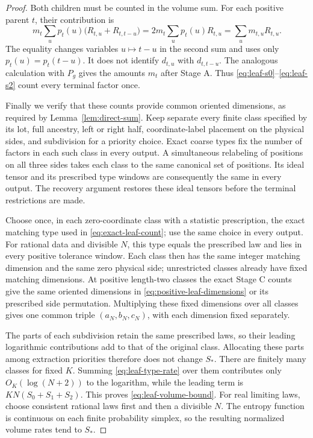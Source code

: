\begin{proof}
Both children must be counted in the volume sum.  For each positive
parent $t$, their contribution is
\[
 m_t\sum_u p_t(u)\bigl(R_{t,u}+R_{t,t-u}\bigr)
       =2m_t\sum_u p_t(u)R_{t,u}
       =\sum_u m_{t,u}R_{t,u}.
\]
The equality changes variables $u\mapsto t-u$ in the second sum and
uses only $p_t(u)=p_t(t-u)$.  It does not identify
$d_{t,u}$ with $d_{t,t-u}$.  The analogous calculation with $P_g$
gives the amounts $m_t$ after Stage A.  Thus
\eqref{eq:leaf-s0}--\eqref{eq:leaf-s2} count every terminal factor
once.

Finally we verify that these counts provide common oriented dimensions,
as required by Lemma~\ref{lem:direct-sum}.  Keep separate every finite
class specified by its lot, full ancestry, left or right half,
coordinate-label placement on the physical sides, and subdivision for
a priority choice.  Exact coarse types fix the number of factors in
each such class in every output.  A simultaneous relabeling of
positions on all three sides takes each class to the same canonical
set of positions.  Its ideal tensor and its prescribed type windows
are consequently the same in every output.  The recovery argument
restores these ideal tensors before the terminal restrictions are
made.

Choose once, in each zero-coordinate class with a statistic
prescription, the exact matching type used in
\eqref{eq:exact-leaf-count}; use the same choice in every output.
For rational data and divisible $N$, this type equals the
prescribed law and lies in every positive tolerance window.  Each
class then has the same integer matching dimension and the same zero
physical side; unrestricted classes already have fixed matching
dimensions.  At positive length-two classes the exact Stage C
counts give the same oriented dimensions in
\eqref{eq:positive-leaf-dimensions} or its prescribed side permutation.
Multiplying these fixed dimensions over all classes gives one common
triple $(a_N,b_N,c_N)$, with each dimension fixed separately.

The parts of each subdivision retain the same prescribed laws, so
their leading logarithmic contributions add to that of the original
class.  Allocating these parts among extraction priorities therefore
does not change $S_*$.
There are finitely many classes for fixed $K$.  Summing
\eqref{eq:leaf-type-rate} over them contributes only
$O_K(\log(N+2))$ to the logarithm, while the leading term is
$KN(S_0+S_1+S_2)$.  This proves
\eqref{eq:leaf-volume-bound}.  For real limiting laws, choose
consistent rational laws first and then a divisible $N$.
The entropy function is continuous on each finite probability simplex,
so the resulting normalized volume rates tend to $S_*$.
\end{proof}

